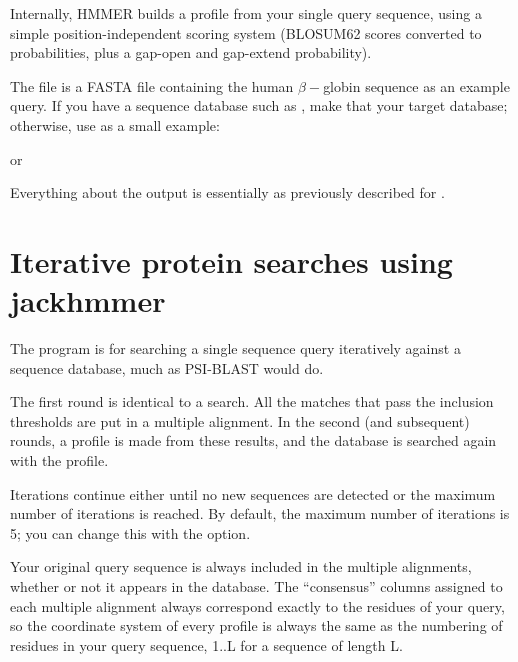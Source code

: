 Internally, HMMER builds a profile from your single query
sequence, using a simple position-independent scoring system (BLOSUM62
scores converted to probabilities, plus a gap-open and gap-extend
probability).

The file  is a FASTA file containing the
human $\beta-$globin sequence as an example query. If you have a
sequence database such as , make that your
target database; otherwise, use  as a
small example:

   \vspace{1ex}
   \vspace{1ex}

or

   \vspace{1ex}
   \vspace{1ex}

Everything about the output is essentially as previously described for
. 




\section{Iterative protein searches using jackhmmer}

The  program is for searching a single sequence query
iteratively against a sequence database, much as PSI-BLAST would do.

The first round is identical to a  search. All the
matches that pass the inclusion thresholds are put in a multiple
alignment. In the second (and subsequent) rounds, a profile is made
from these results, and the database is searched again with the
profile.

Iterations continue either until no new sequences are detected or the
maximum number of iterations is reached. By default, the maximum
number of iterations is 5; you can change this with the 
option.

Your original query sequence is always included in the multiple
alignments, whether or not it appears in the database.  
The ``consensus'' columns assigned to each multiple alignment always
correspond exactly to the residues of your query, so the coordinate
system of every profile is always the same as the numbering of
residues in your query sequence, 1..L for a sequence of length L.

